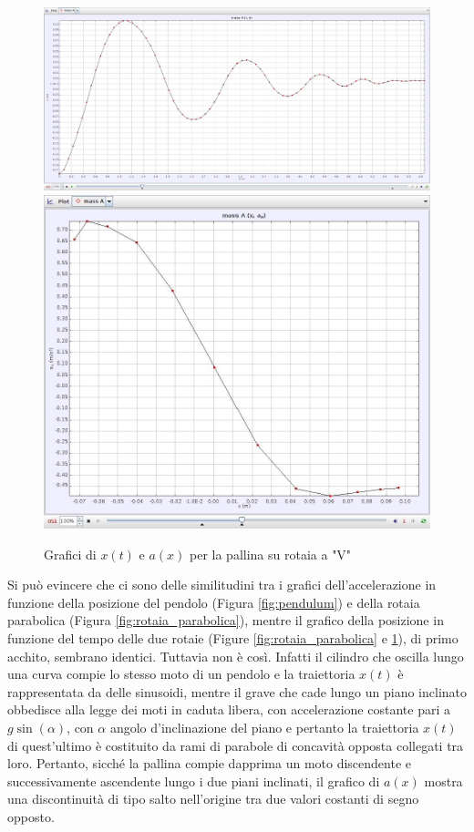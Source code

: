 \documentclass{article}
\begin{document}
\begin{figure}[H]
\centering
  \includegraphics[width=\textwidth]{rotaia_galileo_x_t}
  \includegraphics[width=\textwidth]{rotaia_galileo_a_x}
  \caption{Grafici di $x(t)$ e $a(x)$ per la pallina su rotaia a "V"}
  \label{fig:rotaia_galileo}
\end{figure}

Si può evincere che ci sono delle similitudini tra i grafici dell'accelerazione in
funzione della posizione del pendolo (Figura \ref{fig:pendulum}) e della rotaia parabolica
(Figura \ref{fig:rotaia_parabolica}), mentre il grafico della posizione in funzione
del tempo delle due rotaie (Figure \ref{fig:rotaia_parabolica} e
\ref{fig:rotaia_galileo}), di primo acchito, sembrano identici. Tuttavia non è così.
Infatti il cilindro che oscilla lungo una curva compie lo stesso moto di un pendolo e la traiettoria
$x(t)$ è rappresentata da delle sinusoidi, mentre il grave che cade lungo un piano inclinato obbedisce alla
legge dei moti in caduta libera, con accelerazione costante pari a $g\sin(\alpha)$, con $\alpha$ angolo d'inclinazione del
piano e pertanto la traiettoria $x(t)$ di quest'ultimo è costituito da rami di parabole di concavità opposta
collegati tra loro.
Pertanto, sicché la pallina compie dapprima un moto discendente e successivamente ascendente lungo i due
piani inclinati, il grafico di $a(x)$ mostra una discontinuità di tipo salto nell'origine tra due valori costanti di segno
opposto.
\end{document}

